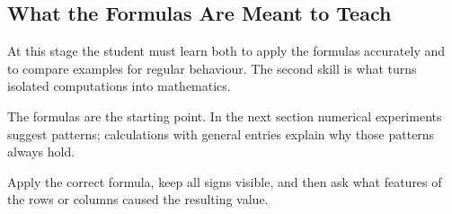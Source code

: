 \subsection{What the Formulas Are Meant to Teach}

\begin{corebox}
At this stage the student must learn both to apply the formulas accurately and to compare examples for regular behaviour. The second skill is what turns isolated computations into mathematics.
\end{corebox}

The formulas are the starting point. In the next section numerical experiments suggest patterns; calculations with general entries explain why those patterns always hold.

\begin{summarybox}
Apply the correct formula, keep all signs visible, and then ask what features of the rows or columns caused the resulting value.
\end{summarybox}
